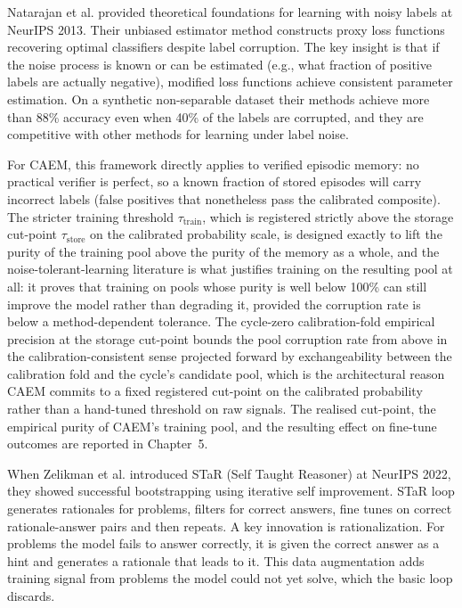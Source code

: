 Natarajan et al. \cite{natarajan2013learning} provided theoretical foundations for learning with noisy labels at NeurIPS 2013. Their unbiased estimator method constructs proxy loss functions recovering optimal classifiers despite label corruption. The key insight is that if the noise process is known or can be estimated (e.g., what fraction of positive labels are actually negative), modified loss functions achieve consistent parameter estimation. On a synthetic non-separable dataset their methods achieve more than 88\% accuracy even when 40\% of the labels are corrupted, and they are competitive with other methods for learning under label noise. 

For CAEM, this framework directly applies to verified episodic memory: no practical verifier is perfect, so a known fraction of stored episodes will carry incorrect labels (false positives that nonetheless pass the calibrated composite). The stricter training threshold $\tau_{\text{train}}$, which is registered strictly above the storage cut-point $\tau_{\text{store}}$ on the calibrated probability scale, is designed exactly to lift the purity of the training pool above the purity of the memory as a whole, and the noise-tolerant-learning literature is what justifies training on the resulting pool at all: it proves that training on pools whose purity is well below 100\% can still improve the model rather than degrading it, provided the corruption rate is below a method-dependent tolerance. The cycle-zero calibration-fold empirical precision at the storage cut-point bounds the pool corruption rate from above in the calibration-consistent sense projected forward by exchangeability between the calibration fold and the cycle's candidate pool, which is the architectural reason CAEM commits to a fixed registered cut-point on the calibrated probability rather than a hand-tuned threshold on raw signals. The realised cut-point, the empirical purity of CAEM's training pool, and the resulting effect on fine-tune outcomes are reported in Chapter~5.

When Zelikman et al. \cite{NEURIPS2022_639a9a17} introduced STaR (Self Taught Reasoner) at NeurIPS 2022, they showed successful bootstrapping using iterative self improvement. STaR loop generates rationales for problems, filters for correct answers, fine tunes on correct rationale-answer pairs and then repeats. A key innovation is rationalization. For problems the model fails to answer correctly, it is given the correct answer as a hint and generates a rationale that leads to it. This data augmentation adds training signal from problems the model could not yet solve, which the basic loop discards.

